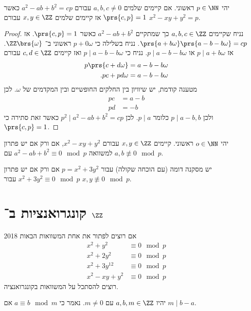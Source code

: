 \documentclass[a4paper,10pt,twoside,openany]{book}
\begin{document}
\begin{theorem}
יהי
$p \in \NN$
ראשוני. אם קיימים שלמים
$a,b,c \neq 0$
עבורם
$a^2 - ab + b^2 = cp$
כאשר
$\prs{c,p} = 1$
אז קיימים שלמים
$x,y\in \ZZ$
עבורם
$x^2 - xy + y^2 = p$.
\end{theorem}
\begin{proof}
נניח שקיימים
$a,b,c \in \ZZ$
כך שמתקיים
$a^2 - ab + b^2$
כאשר
$\prs{c,p} = 1$.
אז
$\prs{a+b\omega}\prs{a-b-b\omega} = cp$.
נניח בשלילה כי
$p + 0\omega$
ראשוני ב־%
$\ZZ\brs{\omega}$.
אז
$p \mid a+b\omega$
או
$p \mid a-b-b\omega$.
נניח כי
$p \mid a-b-b\omega$
ואז קיימים
$c,d\in\ZZ$
עבורם
\begin{align*}
p\prs{c+d\omega} &= a-b-b\omega \\
\text{.} pc + pd\omega &= a-b-b\omega
\end{align*}
מטענה קודמת, יש שיוויון בין החלקים החופשיים ובין המקדמים של
$\omega$.
לכן
\begin{align*}
pc &= a-b \\
pd &= -b
\end{align*}
ולכן
$p\mid a-b, b$
כלומר
$p \mid a$.
לכן
$p^2 \mid a^2 - ab + b^2 = cp$
כאשר זאת סתירה כי
$\prs{c,p} = 1$.
\end{proof}

\begin{corollary}
יהי
$o \in \NN$
ראשוני. קיימים
$x,y\in \ZZ$
עבורם
$x^2 - xy + y^2$,
אם ורק אם יש פתרון למשוואה
$a^2 - ab + b^2 \equiv 0 \mod{p}$
עם
$a,b \not\equiv 0 \mod{p}$.
\end{corollary}
\begin{remark}
יש מסקנה דומה (עם הוכחה שקולה) עבור
$p = x^2 + 3y^2$
אם ורק אם יש פתרון
$x^2 + 3y^2 \equiv 0 \mod{p}$
עבור
$x,y \not\equiv 0 \mod{p}$.
\end{remark}
\section{קונגרואנציות ב־%
$\ZZ$}
אם רוצים לפתור את אחת המשוואות הבאות%
%
{2018}
\begin{align*}
x^2 + y^2 &\equiv 0 \mod{p} \\
x^2 + 2y^2 &\equiv 0 \mod{p} \\
x^2 + 3y^12 &\equiv 0 \mod{p} \\
x^2 -xy + y^2 &\equiv 0 \mod{p}
\end{align*}
רוצים להסתכל על המשוואות בקונגרואנציה.

\begin{definition}
יהיו
$a,b,m\in \ZZ$
עם
$m \neq 0$.
נאמר כי
$a \equiv b \mod{m}$
אם
$m \mid b-a$.

\end{definition}
\end{document}
